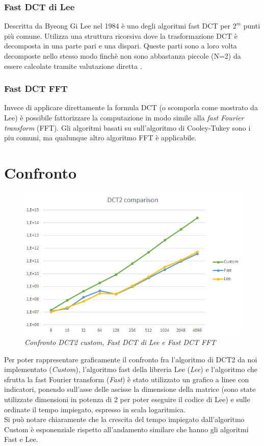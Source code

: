 \documentclass[a4paper,12pt]{report}
\begin{document}
\subsubsection*{Fast DCT di Lee}
Descritta da Byeong Gi Lee \cite{Lee} nel 1984 è uno degli algoritmi fast DCT per \(2^m\) punti più comune. Utilizza una struttura ricorsiva dove la trasformazione DCT è decomposta in una parte pari e una dispari. Queste parti sono a loro volta decomposte nello stesso modo finchè non sono abbastanza piccole (N=2) da essere calcolate tramite valutazione diretta \cite{LAGERSTRM2001DesignAI}.

\subsubsection*{Fast DCT FFT}
Invece di applicare direttamente la formula DCT (o scomporla come mostrato da Lee) è possibile fattorizzare la computazione in modo simile alla \textit{fast Fourier transform} (FFT). Gli algoritmi basati su sull'algoritmo di Cooley-Tukey \cite{10.2307/2003354} sono i piu comuni, ma qualunque altro algoritmo FFT è applicabile. 

\section{Confronto}
\begin{figure}[H]
\centering
\includegraphics[width=0.77\linewidth]{../img/comparison.png}
\caption{\textit{Confronto DCT2 custom, Fast DCT di Lee e Fast DCT FFT}}
\end{figure}
Per poter rappresentare graficamente il confronto fra l'algoritmo di DCT2 da noi implementato (\textit{Custom}), l'algoritmo fast della libreria Lee (\textit{Lee}) e l'algoritmo che sfrutta la fast Fourier transform (\textit{Fast}) è stato utilizzato un grafico a linee con indicatori, ponendo sull'asse delle ascisse la dimensione della matrice (sono state utilizzate dimensioni in potenza di 2 per poter eseguire il codice di Lee) e sulle ordinate il tempo impiegato, espresso in scala logaritmica. \\
Si può notare chiaramente che la crescita del tempo impiegato dall'algoritmo Custom è esponenziale rispetto all'andamento similare che hanno gli algoritmi Fast e Lee. %
\end{document}
